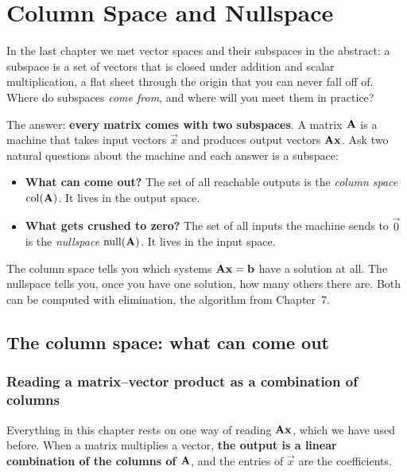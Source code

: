 \chapter{Column Space and Nullspace}

In the last chapter we met vector spaces and their subspaces in the abstract:
a subspace is a set of vectors that is closed under addition and scalar
multiplication, a flat sheet through the origin that you can never fall off of.
Where do subspaces \emph{come from}, and where will you meet them in practice?

The answer: \textbf{every matrix comes with two subspaces}.
A matrix $\mathbf{A}$ is a machine that takes input vectors $\vec{x}$ and produces
output vectors $\mathbf{A}\mathbf{x}$. Ask two natural questions about the machine
and each answer is a subspace:

\begin{itemize}
  \item \textbf{What can come out?} The set of all reachable outputs is the
  \emph{column space} $\operatorname{col}(\mathbf{A})$. It lives in the output space.
  \item \textbf{What gets crushed to zero?} The set of all inputs the machine
  sends to $\vec{0}$ is the \emph{nullspace} $\operatorname{null}(\mathbf{A})$. It lives in the
  input space.
\end{itemize}

The column space tells you which systems
$\mathbf{A}\mathbf{x} = \mathbf{b}$ have a solution at all. The nullspace tells you, once
you have one solution, how many others there are. Both can be computed with
elimination, the algorithm from Chapter~7.

\section{The column space: what can come out}

\subsection{Reading a matrix--vector product as a combination of columns}

Everything in this chapter rests on one way of reading $\mathbf{A}\mathbf{x}$, which
we have used before. When a matrix multiplies a
vector, \textbf{the output is a linear combination of the columns of
$\mathbf{A}$}, and the entries of $\vec{x}$ are the coefficients.


